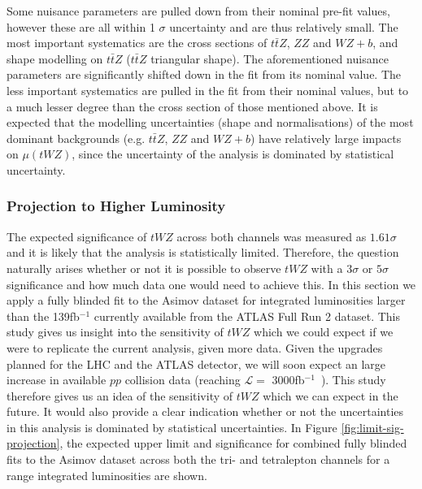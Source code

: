 Some nuisance parameters are pulled down from their nominal pre-fit values, however these are all within 1 $\sigma$ uncertainty and are thus relatively small. The most important systematics are the cross sections of $t\bar{t}Z$, $ZZ$ and $WZ+b$, and shape modelling on $t\bar{t}Z$ ($t\bar{t}Z$ triangular shape). The aforementioned nuisance parameters are significantly shifted down in the fit from its nominal value. The less important systematics are pulled in the fit from their nominal values, but to a much lesser degree than the cross section of those mentioned above. It is expected that the modelling uncertainties (shape and normalisations) of the most dominant backgrounds (e.g. $t\bar{t}Z$, $ZZ$ and $WZ+b$) have relatively large impacts on $\mu(tWZ)$, since the uncertainty of the analysis is dominated by statistical uncertainty.


\subsubsection{Projection to Higher Luminosity}

The expected significance of $tWZ$ across both channels was measured as $1.61\sigma$ and it is likely that the analysis is statistically limited. Therefore, the question naturally arises whether or not it is possible to observe $tWZ$ with a $3\sigma$ or $5\sigma$ significance and how much data one would need to achieve this. In this section we apply a fully blinded fit to the Asimov dataset for integrated luminosities larger than the 139fb$^{-1}$ currently available from the ATLAS Full Run 2 dataset. This study gives us insight into the sensitivity of $tWZ$ which we could expect if we were to replicate the current analysis, given more data. Given the upgrades planned for the LHC and the ATLAS detector, we will soon expect an large increase in available $pp$ collision data (reaching $\mathcal{L} =$ 3000fb$^{-1}$~\cite{HL-LHC-paper}). This study therefore gives us an idea of the sensitivity of $tWZ$ which we can expect in the future. It would also provide a clear indication whether or not the uncertainties in this analysis is dominated by statistical uncertainties. In Figure \ref{fig:limit-sig-projection}, the expected upper limit and significance for combined fully blinded fits to the Asimov dataset across both the tri- and tetralepton channels for a range integrated luminosities are shown.

